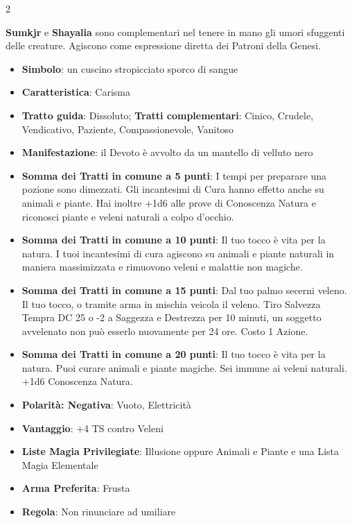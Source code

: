 \begin{multicols}{2}
\begin{narratore}
\medskip

\textbf{Sumkjr} e \textbf{Shayalia} sono complementari nel tenere in mano gli umori sfuggenti delle creature. Agiscono come espressione diretta dei Patroni della Genesi.

\end{narratore}

\medskip

\begin{itemize}[leftmargin=*] \setlength{\itemsep}{0pt}
\item \textbf{Simbolo}: un cuscino stropicciato sporco di sangue
\item \textbf{Caratteristica}: Carisma
\item \textbf{Tratto guida}: Dissoluto; \textbf{Tratti complementari}: Cinico, Crudele, Vendicativo, Paziente, Compassionevole, Vanitoso
\item \textbf{Manifestazione}: il Devoto è avvolto da un mantello di velluto nero
\item \textbf{Somma dei Tratti in comune a 5 punti}: I tempi per preparare una pozione sono dimezzati. Gli incantesimi di Cura hanno effetto anche su animali e piante. Hai inoltre +1d6 alle prove di Conoscenza Natura e riconosci piante e veleni naturali a colpo d'occhio.
\item \textbf{Somma dei Tratti in comune a 10 punti}: Il tuo tocco è vita per la natura. I tuoi incantesimi di cura agiscono su animali e piante naturali in maniera massimizzata e rimuovono veleni e malattie non magiche.
\item \textbf{Somma dei Tratti in comune a 15 punti}: Dal tuo palmo secerni veleno. Il tuo tocco, o tramite arma in mischia veicola il veleno. Tiro Salvezza Tempra DC 25 o -2 a Saggezza e Destrezza per 10 minuti, un soggetto avvelenato non può esserlo nuovamente per 24 ore. Costo 1 Azione.
\item \textbf{Somma dei Tratti in comune a 20 punti}: Il tuo tocco è vita per la natura. Puoi curare animali e piante magiche. Sei immune ai veleni naturali. +1d6 Conoscenza Natura.
\item \textbf{Polarità: Negativa}: Vuoto, Elettricità
\item \textbf{Vantaggio}: +4 TS contro Veleni
\item \textbf{Liste Magia Privilegiate}: Illusione oppure Animali e Piante e una Lista Magia Elementale
\item \textbf{Arma Preferita}: Frusta
\item \textbf{Regola}: Non rinunciare ad umiliare
\end{itemize}


\end{multicols}
